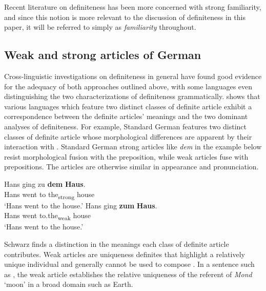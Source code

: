 \documentclass[output=paper,modfonts,nonflat]{langsci/langscibook}
\begin{document}
Recent literature on definiteness has been more concerned with strong familiarity, and since this notion is more relevant to the discussion of definiteness in this paper, it will be referred to simply as \textit{familiarity} throughout.

\subsection{Weak and strong articles of German} \label{sec:cisneros:2.2}

Cross-linguistic investigations on definiteness in general have found good evidence for the adequacy of both approaches outlined above, with some languages even distinguishing the two characterizations of definiteness grammatically.\linebreak \citet{Schwarz2009, Schwarz2013} shows that various  languages which feature two distinct classes of definite article exhibit a correspondence between the definite articles' meanings and the two dominant analyses of definiteness.  For example, Standard German features two distinct classes of definite article whose morphological differences are apparent by their interaction with .  Standard German strong articles like \textit{dem} in the example below resist morphological fusion with the preposition, while 
weak articles fuse with prepositions.  The articles are otherwise similar in appearance and pronunciation.

\ea \label{ex:cisneros:8}
\ea
\gll
Hans ging zu \textbf{dem} \textbf{Haus}.\\
Hans went to the\textsubscript{strong} house\\
\glt
`Hans went to the house.'
\ex
\gll
Hans ging \textbf{zum} \textbf{Haus}.\\
Hans went to.the\textsubscript{weak} house\\
\glt
`Hans went to the house.'
\z
\z

Schwarz finds a distinction in the meanings each class of definite article contributes.  Weak articles are uniqueness definites that highlight a relatively unique individual and generally cannot be used to compose .  In a sentence such as , the weak article establishes the relative uniqueness of the referent of \textit{Mond} `moon' in a broad domain such as Earth.
\end{document}
